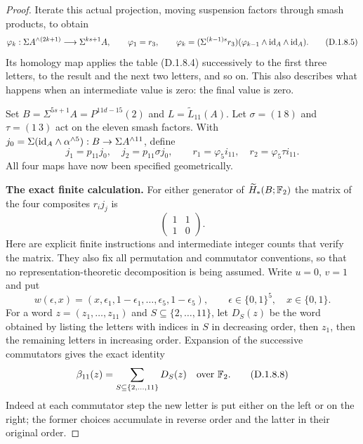 \begin{proof}
Iterate this actual projection, moving suspension factors through
smash products, to obtain
\[
 \varphi_k:\Sigma A^{\wedge(2k+1)}
                     \longrightarrow\Sigma^{ks+1}A,
 \qquad
 \varphi_1=r_3,\qquad
 \varphi_k=(\Sigma^{(k-1)s}r_3)
                (\varphi_{k-1}\wedge\mathrm{id}_A\wedge\mathrm{id}_A).
 \tag{D.1.8.5}
\]
Its homology map applies the table (D.1.8.4) successively to the
first three letters, to the result and the next two letters, and
so on. This also describes what happens when an intermediate
value is zero: the final value is zero.

Set $B=\Sigma^{5s+1}A=P^{11d-15}(2)$ and
$L=\widetilde L_{11}(A)$. Let $\sigma=(1\ 8)$ and
$\tau=(1\ 3)$ act on the eleven smash factors. With
$j_0=\Sigma(\mathrm{id}_A\wedge\alpha^{\wedge5}):
B\to\Sigma A^{\wedge11}$, define
\[
 j_1=p_{11}j_0,\quad j_2=p_{11}\sigma j_0,
 \qquad
 r_1=\varphi_5i_{11},\quad r_2=\varphi_5\tau i_{11}.
 \tag{D.1.8.6}
\]
All four maps have now been specified geometrically.

\medskip\noindent
\textbf{The exact finite calculation.}
For either generator of $\widetilde H_*(B;\mathbb F_2)$ the matrix
of the four composites $r_i j_j$ is
\[
                     \begin{pmatrix}1&1\\1&0\end{pmatrix}.
 \tag{D.1.8.7}
\]
Here are explicit finite instructions and intermediate integer
counts that verify the matrix. They also fix all permutation and
commutator conventions, so that no representation-theoretic
decomposition is being assumed. Write $u=0$, $v=1$ and put
\[
 w(\epsilon,x)=
 (x,\epsilon_1,1-\epsilon_1,\ldots,
       \epsilon_5,1-\epsilon_5),
 \qquad\epsilon\in\{0,1\}^5,\quad x\in\{0,1\}.
\]
For a word $z=(z_1,\ldots,z_{11})$ and
$S\subseteq\{2,\ldots,11\}$, let $D_S(z)$ be the word obtained
by listing the letters with indices in $S$ in decreasing order,
then $z_1$, then the remaining letters in increasing order.
Expansion of the successive commutators gives the exact identity
\[
               \beta_{11}(z)=\sum_{S\subseteq\{2,\ldots,11\}}
                                  D_S(z)\quad\hbox{over }\mathbb F_2.
 \tag{D.1.8.8}
\]
Indeed at each commutator step the new letter is put either on
the left or on the right; the former choices accumulate in
reverse order and the latter in their original order.


\end{proof}
